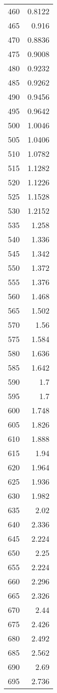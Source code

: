 \begin{supertabular}{ l | *{1}{d{10}}}
460 & 0.8122 \\
465 & 0.916 \\
470 & 0.8836 \\
475 & 0.9008 \\
480 & 0.9232 \\
485 & 0.9262 \\
490 & 0.9456 \\
495 & 0.9642 \\
500 & 1.0046 \\
505 & 1.0406 \\
510 & 1.0782 \\
515 & 1.1282 \\
520 & 1.1226 \\
525 & 1.1528 \\
530 & 1.2152 \\
535 & 1.258 \\
540 & 1.336 \\
545 & 1.342 \\
550 & 1.372 \\
555 & 1.376 \\
560 & 1.468 \\
565 & 1.502 \\
570 & 1.56 \\
575 & 1.584 \\
580 & 1.636 \\
585 & 1.642 \\
590 & 1.7 \\
595 & 1.7 \\
600 & 1.748 \\
605 & 1.826 \\
610 & 1.888 \\
615 & 1.94 \\
620 & 1.964 \\
625 & 1.936 \\
630 & 1.982 \\
635 & 2.02 \\
640 & 2.336 \\
645 & 2.224 \\
650 & 2.25 \\
655 & 2.224 \\
660 & 2.296 \\
665 & 2.326 \\
670 & 2.44 \\
675 & 2.426 \\
680 & 2.492 \\
685 & 2.562 \\
690 & 2.69 \\
695 & 2.736 \\

\end{supertabular}
